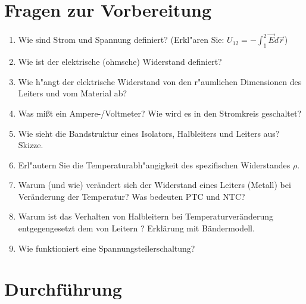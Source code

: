 \section{Fragen zur Vorbereitung}

\begin{enumerate}
 \item Wie sind Strom und Spannung definiert? (Erkl"aren Sie: $U_{12} = - \int_{1}^{2}{\vec{E}d\vec{r}}$)
 \item Wie ist der elektrische (ohmsche) Widerstand definiert?
 \item Wie h"angt der elektrische Widerstand von den r"aumlichen Dimensionen des Leiters und vom Material ab?
 \item Was mi{\ss}t ein Ampere-/Voltmeter? Wie wird es in den Stromkreis geschaltet?
 \item Wie sieht die Bandstruktur eines Isolators, Halbleiters und Leiters aus? Skizze.
 \item Erl"autern Sie die Temperaturabh"angigkeit des spezifischen Widerstandes $\rho$.
 \item Warum (und wie) verändert sich der Widerstand eines Leiters (Metall) bei Veränderung der Temperatur? Was bedeuten PTC und NTC?
 \item Warum ist das Verhalten von Halbleitern bei Temperaturveränderung entgegengesetzt dem von Leitern ? Erklärung mit Bändermodell.
 \item Wie funktioniert eine Spannungsteilerschaltung?
\end{enumerate}

\section{Durchführung} 

